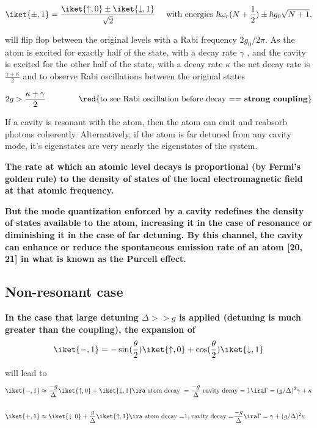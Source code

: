  \[
   \iket{\pm,1}         =         \frac{\iket{\uparrow,0}         \pm
     \iket{\downarrow,1}}{\sqrt{2}}   \quad   \text{  with   energies   }
   \hbar\omega_r(N+\frac{1}{2}) \pm \hbar g_0\sqrt{N+1},
 \]

 \noindent will  flip flop  between the original  levels with  a Rabi
 frequency $ 2g_0/2\pi $. As the  atom is excited for exactly half of
 the state, with a  decay rate $ \gamma $ , and the  cavity is excited for
 the other half of  the state, with a decay rate $ \kappa  $ the net decay
 rate is $ \frac{\gamma+\kappa}{2} $ and to observe Rabi oscillations
 between the original states

 \[
   2g  > \frac{\kappa+\gamma}{2}  \qquad\qquad\text{\red{to see  Rabi
       oscillation before decay == \textbf{strong coupling}}}
 \]

 \begin{framed}\noindent
   If a cavity is resonant with the  atom, then the atom can emit and
   reabsorb photons  coherently.  Alternatively,  if the atom  is far
   detuned from any cavity mode, it’s eigenstates are very nearly the
   eigenstates of the system.

   \textbf{The rate at  which an atomic level  decays is proportional
     (by Fermi’s golden  rule) to the density of states  of the local
     electromagnetic field at that atomic frequency.}

   \textbf{But the  mode quantization enforced by  a cavity redefines
     the density  of states available  to the atom, increasing  it in
     the  case of  resonance or  diminishing it  in the  case of  far
     detuning. By this channel, the  cavity can enhance or reduce the
     spontaneous emission rate  of an atom [20, 21] in  what is known
     as the Purcell effect.}
 \end{framed}

 \subsection{Non-resonant case}\label{sec:stark-shift}

 \textbf{In the  case that  large detuning $\Delta  >> g$  is applied
   (detuning is much greater than the coupling), the expansion of}
 \begin{equation}
   \iket{-,1}      =     -\sin(\frac{\theta}{2})\iket{\uparrow,0}     +
   \cos(\frac{\theta}{2})\iket{\downarrow,1}
 \end{equation}

 \noindent will lead to
 \[
   \begin{aligned}
     \iket{-,1} &\approx \frac{-g}{\Delta}\iket{\uparrow,0} + \iket{\downarrow,1} \ira \text{ atom decay } = \frac{-g}{\Delta} \text{ cavity decay = 1}\ira \Gamma = (g/\Delta)^2\gamma+\kappa\\
     \\
     \iket{+,1}        &        \approx        \iket{\downarrow,0}        +
     \frac{g}{\Delta}\iket{\uparrow,1}\ira    \text{   atom    decay   =1,
     }\text{cavity   decay  =}   \frac{-g}{\Delta}   \ira   \Gamma  =   \gamma+
     (g/\Delta)^2\kappa
   \end{aligned}
 \]

